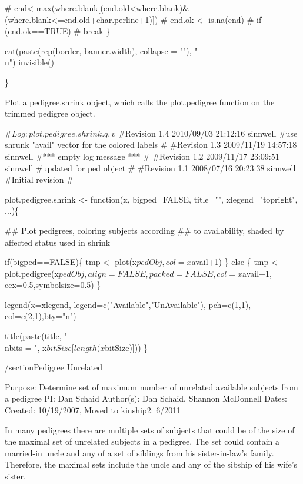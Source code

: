 \documentclass{article}
\begin{document}
#   end<-max(where.blank[(end.old<where.blank)&(where.blank<=end.old+char.perline+1)])
#   end.ok <- is.na(end)
#   if (end.ok==TRUE)
#      break
  \}
  
  cat(paste(rep(border, banner.width), collapse = ""), "\\n")
  invisible()
  
\}

\nwendcode{}\nwdocspar


Plot a pedigree.shrink object, which calls the plot.pedigree function on the trimmed 
pedigree object.

\nwenddocs{}\endmoddef
#$Log: plot.pedigree.shrink.q,v $
#Revision 1.4  2010/09/03 21:12:16  sinnwell
#use shrunk "avail" vector for the colored labels
#
#Revision 1.3  2009/11/19 14:57:18  sinnwell
#*** empty log message ***
#
#Revision 1.2  2009/11/17 23:09:51  sinnwell
#updated for ped object
#
#Revision 1.1  2008/07/16 20:23:38  sinnwell
#Initial revision
#

plot.pedigree.shrink <- function(x, bigped=FALSE, title="", 
                                 xlegend="topright", ...)\{

  ##  Plot pedigrees, coloring subjects according
  ##   to availability, shaded by affected status used in shrink

  if(bigped==FALSE)\{
    tmp <- plot(x$pedObj, col=x$avail+1)
  \} else \{
    tmp <- plot.pedigree(x$pedObj, align=FALSE, packed=FALSE,
                         col=x$avail+1, cex=0.5,symbolsize=0.5)
  \}
  
  legend(x=xlegend,
         legend=c("Available","UnAvailable"),
         pch=c(1,1), col=c(2,1),bty="n")
  
  
  title(paste(title, "\\nbits = ", x$bitSize[length(x$bitSize)]))
\}


\nwendcode{}\nwdocspar


/section{Pedigree Unrelated}

Purpose: Determine set of maximum number of unrelated
         available subjects from a pedigree
PI:      Dan Schaid
Author(s): Dan Schaid, Shannon McDonnell
Dates:   Created: 10/19/2007, Moved to kinship2: 6/2011

In many pedigrees there are multiple sets of subjects that could be of the 
size of the maximal set of unrelated subjects in a pedigree.  The set could
contain a married-in uncle and any of a set of siblings from his 
sister-in-law's family.  Therefore, the maximal sets include the uncle and 
any of the sibship of his wife's sister.
\end{document}
